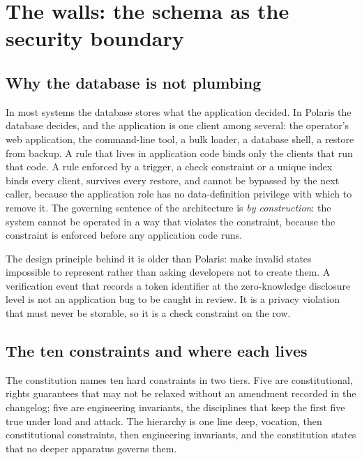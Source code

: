 \section{The walls: the schema as the security boundary}
\label{sec:walls}

\subsection{Why the database is not plumbing}

In most systems the database stores what the application decided. In Polaris the database decides,
and the application is one client among several: the operator's web application, the command-line
tool, a bulk loader, a database shell, a restore from backup. A rule that lives in application code
binds only the clients that run that code. A rule enforced by a trigger, a check constraint or a
unique index binds every client, survives every restore, and cannot be bypassed by the next caller,
because the application role has no data-definition privilege with which to remove it. The
governing sentence of the architecture is \emph{by construction}: the system cannot be operated in a
way that violates the constraint, because the constraint is enforced before any application code
runs. \sImpl

The design principle behind it is older than Polaris: make invalid states impossible to represent
rather than asking developers not to create them. A verification event that records a token
identifier at the zero-knowledge disclosure level is not an application bug to be caught in review.
It is a privacy violation that must never be storable, so it is a check constraint on the row.

\subsection{The ten constraints and where each lives}

The constitution names ten hard constraints in two tiers. Five are constitutional, rights
guarantees that may not be relaxed without an amendment recorded in the changelog; five are
engineering invariants, the disciplines that keep the first five true under load and attack. The
hierarchy is one line deep, vocation, then constitutional constraints, then engineering invariants,
and the constitution states that no deeper apparatus governs them.

